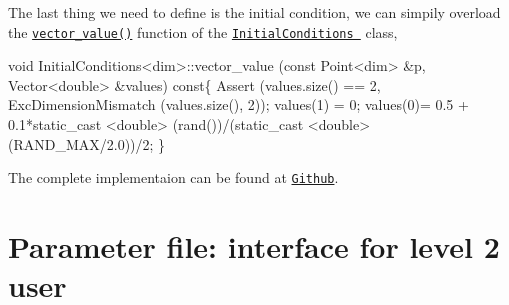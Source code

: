  The last thing we need to define is the initial condition, we can simpily overload the \href{../html/class_initial_conditions.html#aa10cfdd7350c3810a8deab707f397657}{\tt vector\-\_\-value()} function of the \href{../html/class_initial_conditions.html}{\tt Initial\-Conditions } class, 
\begin{DoxyCode}
\textcolor{keywordtype}{void} InitialConditions<dim>::vector_value (\textcolor{keyword}{const} Point<dim>   &p, Vector<double>   &values)\textcolor{keyword}{ const}\{
  Assert (values.size() == 2, ExcDimensionMismatch (values.size(), 2));
  values(1) = 0;    
  values(0)= 0.5 + 0.1*static\_cast <\textcolor{keywordtype}{double}> (rand())/(static\_cast <double>(RAND\_MAX/2.0))/2;
\}
\end{DoxyCode}
 The complete implementaion can be found at \href{https://github.com/mechanoChem/mechanoChemFEM/tree/example/Example1_diffusion_eaction}{\tt Github}.\hypertarget{growth_file}{}\section{Parameter file\-: interface for level 2 user}\label{growth_file}


